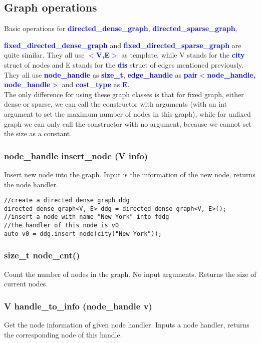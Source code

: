 \documentclass[]{article}
\begin{document}
\subsection{Graph operations}
Basic operations for \textbf{\textcolor{blue}{directed\_dense\_graph}}, \textbf{\textcolor{blue}{directed\_sparse\_graph}}, 

\textbf{\textcolor{blue}{fixed\_directed\_dense\_graph}} and \textbf{\textcolor{blue}{fixed\_directed\_sparse\_graph}} are quite similar. They all use \textbf{\textcolor{blue}{$<$V,E$>$}} as template, while V stands for the \textbf{\textcolor{blue}{city}} struct of nodes and E stands for the \textbf{\textcolor{blue}{dis}} struct of edges mentioned previously. They all use \textbf{\textcolor{blue}{node\_handle}} as \textbf{\textcolor{blue}{size\_t}}, \textbf{\textcolor{blue}{edge\_handle}} as \textbf{\textcolor{blue}{pair$<$node\_handle, node\_handle$>$}} and \textbf{\textcolor{blue}{cost\_type}} as \textbf{\textcolor{blue}{E}}.\\
The only difference for using these graph classes is that for fixed graph, either dense or sparse, we can call the constructor with arguments (with an int argument to set the maximum number of nodes in this graph), while for unfixed graph we can only call the constructor with no argument, because we cannot set the size as a constant.
\subsubsection{node\_handle insert\_node (V info)}
Insert new node into the graph.
Input is the information of the new node, returns the node handler.
\begin{lstlisting}
//create a directed dense graph ddg
directed_dense_graph<V, E> ddg = directed_dense_graph<V, E>();
//insert a node with name "New York" into fddg
//the handler of this node is v0
auto v0 = ddg.insert_node(city("New York")); 
\end{lstlisting}
\subsubsection{size\_t node\_cnt()}
Count the number of nodes in the graph.
No input arguments. Returns the size of current nodes.
\subsubsection{V handle\_to\_info (node\_handle v)}
Get the node information of given node handler.
Inputs a node handler, returns the corresponding node of this handle.
\end{document}
